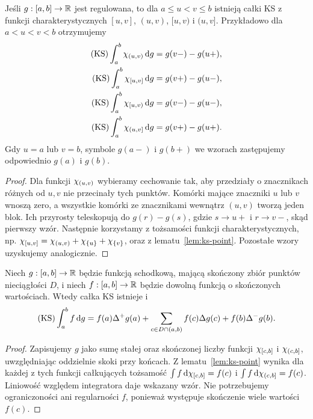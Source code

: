 \begin{lemat}
\label{lem:ks-indicators}
Jeśli $g:[a,b]\to\mathbb R$ jest regulowana, to dla $a\le u<v\le b$ istnieją całki KS z funkcji charakterystycznych $[u,v]$, $(u,v)$, $[u,v)$ i $(u,v]$. Przykładowo dla $a<u<v<b$ otrzymujemy
\[
 \begin{aligned}
 (\mathrm{KS})\int_a^b\chi_{(u,v)}\,\mathrm dg&=g(v-)-g(u+),\\
 (\mathrm{KS})\int_a^b\chi_{[u,v]}\,\mathrm dg&=g(v+)-g(u-),\\
 (\mathrm{KS})\int_a^b\chi_{[u,v)}\,\mathrm dg&=g(v-)-g(u-),\\
 (\mathrm{KS})\int_a^b\chi_{(u,v]}\,\mathrm dg&=g(v+)-g(u+).
 \end{aligned}
\]
Gdy $u=a$ lub $v=b$, symbole $g(a-)$ i $g(b+)$ we wzorach zastępujemy odpowiednio $g(a)$ i $g(b)$.
\end{lemat}
\begin{proof}
Dla funkcji $\chi_{(u,v)}$ wybieramy cechowanie tak, aby przedziały o znacznikach różnych od $u,v$ nie przecinały tych punktów. Komórki mające znaczniki $u$ lub $v$ wnoszą zero, a wszystkie komórki ze znacznikami wewnątrz $(u,v)$ tworzą jeden blok. Ich przyrosty teleskopują do $g(r)-g(s)$, gdzie $s\to u+$ i $r\to v-$, skąd pierwszy wzór. Następnie korzystamy z tożsamości funkcji charakterystycznych, np. $\chi_{[u,v]}=\chi_{(u,v)}+\chi_{\{u\}}+\chi_{\{v\}}$, oraz z lematu~\ref{lem:ks-point}. Pozostałe wzory uzyskujemy analogicznie.
\end{proof}

\begin{twierdzenie}
\label{tw:ks-step}
Niech $g:[a,b]\to\mathbb R$ będzie funkcją schodkową, mającą skończony zbiór punktów nieciągłości $D$, i niech $f:[a,b]\to\mathbb R$ będzie dowolną funkcją o skończonych wartościach. Wtedy całka KS istnieje i
\[
 (\mathrm{KS})\int_a^b f\,\mathrm dg
 =f(a)\Delta^+g(a)+\sum_{c\in D\cap(a,b)}f(c)\Delta g(c)+f(b)\Delta^-g(b).
\]
\end{twierdzenie}
\begin{proof}
Zapisujemy $g$ jako sumę stałej oraz skończonej liczby funkcji $\chi_{[c,b]}$ i $\chi_{(c,b]}$, uwzględniając oddzielnie skoki przy końcach. Z lematu~\ref{lem:ks-point} wynika dla każdej z tych funkcji całkujących tożsamość $\int f\,\mathrm d\chi_{[c,b]}=f(c)$ i $\int f\,\mathrm d\chi_{(c,b]}=f(c)$. Liniowość względem integratora daje wskazany wzór. Nie potrzebujemy ograniczoności ani regularności $f$, ponieważ występuje skończenie wiele wartości $f(c)$.
\end{proof}

